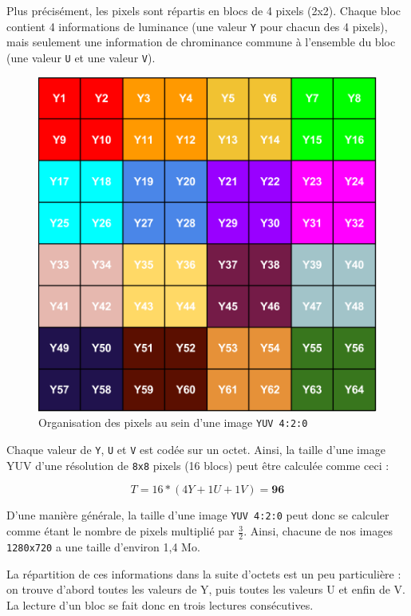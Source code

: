 \documentclass[11pt,a4paper]{article}
\begin{document}
\bigbreak
Plus précisément, les pixels sont répartis en blocs de 4 pixels (2x2).
Chaque bloc contient 4 informations de luminance (une valeur \texttt{Y} pour chacun des 4 pixels), mais seulement une information de chrominance commune à l'ensemble du bloc (une valeur \texttt{U} et une valeur \texttt{V}).

\begin{figure}[H]
\begin{center}
\includegraphics[scale=0.5]{images/yuv1.png}
\end{center}
\caption{Organisation des pixels au sein d'une image \texttt{YUV 4:2:0}}
\label{}
\end{figure}

\bigbreak
Chaque valeur de \texttt{Y}, \texttt{U} et \texttt{V} est codée sur un octet.
Ainsi, la taille d'une image YUV d'une résolution de \texttt{8x8} pixels (16 blocs) peut être calculée comme ceci :

$$ T = 16 * (4Y + 1U + 1V) = \mathbf{96}$$

D'une manière générale, la taille d'une image \texttt{YUV 4:2:0} peut donc se calculer comme étant le nombre de pixels multiplié par $\frac{3}{2}$.
Ainsi, chacune de nos images \texttt{1280x720} a une taille d'environ 1,4 Mo.

\bigbreak
La répartition de ces informations dans la suite d'octets est un peu particulière : on trouve d'abord toutes les valeurs de Y, puis toutes les valeurs U et enfin de V.
La lecture d'un bloc se fait donc en trois lectures consécutives.
\end{document}
